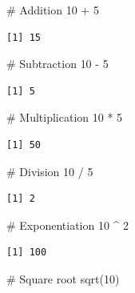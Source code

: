 \documentclass[
  letterpaper,
  DIV=11,
  numbers=noendperiod]{scrreprt}
\newenvironment{Shaded}{\begin{snugshade}}{\end{snugshade}}
\newcommand{\CommentTok}[1]{\textcolor[rgb]{0.37,0.37,0.37}{#1}}
\newcommand{\DecValTok}[1]{\textcolor[rgb]{0.68,0.00,0.00}{#1}}
\newcommand{\FunctionTok}[1]{\textcolor[rgb]{0.28,0.35,0.67}{#1}}
\newcommand{\NormalTok}[1]{\textcolor[rgb]{0.00,0.23,0.31}{#1}}
\newcommand{\SpecialCharTok}[1]{\textcolor[rgb]{0.37,0.37,0.37}{#1}}
\begin{document}
\begin{Shaded}
\begin{Highlighting}[]
\CommentTok{\# Addition}
\DecValTok{10} \SpecialCharTok{+} \DecValTok{5}
\end{Highlighting}
\end{Shaded}

\begin{verbatim}
[1] 15
\end{verbatim}

\begin{Shaded}
\begin{Highlighting}[]
\CommentTok{\# Subtraction}
\DecValTok{10} \SpecialCharTok{{-}} \DecValTok{5}
\end{Highlighting}
\end{Shaded}

\begin{verbatim}
[1] 5
\end{verbatim}

\begin{Shaded}
\begin{Highlighting}[]
\CommentTok{\# Multiplication}
\DecValTok{10} \SpecialCharTok{*} \DecValTok{5}
\end{Highlighting}
\end{Shaded}

\begin{verbatim}
[1] 50
\end{verbatim}

\begin{Shaded}
\begin{Highlighting}[]
\CommentTok{\# Division}
\DecValTok{10} \SpecialCharTok{/} \DecValTok{5}
\end{Highlighting}
\end{Shaded}

\begin{verbatim}
[1] 2
\end{verbatim}

\begin{Shaded}
\begin{Highlighting}[]
\CommentTok{\# Exponentiation}
\DecValTok{10} \SpecialCharTok{\^{}} \DecValTok{2}
\end{Highlighting}
\end{Shaded}

\begin{verbatim}
[1] 100
\end{verbatim}

\begin{Shaded}
\begin{Highlighting}[]
\CommentTok{\# Square root}
\FunctionTok{sqrt}\NormalTok{(}\DecValTok{10}\NormalTok{)}
\end{Highlighting}
\end{Shaded}
\end{document}
